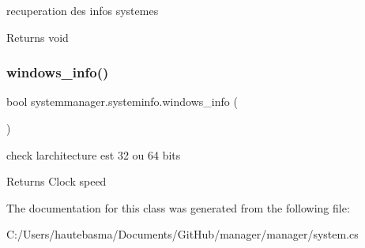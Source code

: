 recuperation des infos systemes 

\begin{DoxyReturn}{Returns}
void
\end{DoxyReturn}
\mbox{\label{classsystemmanager_1_1systeminfo_a63ce06565645345c5d45034bb05d462e}} 
\subsubsection{\texorpdfstring{windows\+\_\+info()}{windows\_info()}}
{\footnotesize\ttfamily bool systemmanager.\+systeminfo.\+windows\+\_\+info (\begin{DoxyParamCaption}{ }\end{DoxyParamCaption})}



check l\textquotesingle{}architecture est 32 ou 64 bits 

\begin{DoxyReturn}{Returns}
Clock speed
\end{DoxyReturn}


The documentation for this class was generated from the following file\+:\begin{DoxyCompactItemize}
\item 
C\+:/\+Users/hautebasma/\+Documents/\+Git\+Hub/manager/manager/system.\+cs\end{DoxyCompactItemize}
